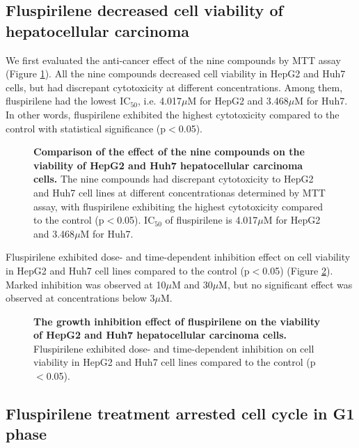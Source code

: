 \documentclass[10pt,letterpaper]{article}
\begin{document}
\subsection*{Fluspirilene decreased cell viability of hepatocellular carcinoma}

We first evaluated the anti-cancer effect of the nine compounds by MTT assay (Figure \ref{CellViabilityAgainstConcentration}). All the nine compounds decreased cell viability in HepG2 and Huh7 cells, but had discrepant cytotoxicity at different concentrations. Among them, fluspirilene had the lowest IC$_{50}$, i.e. 4.017$\mu$M for HepG2 and 3.468$\mu$M for Huh7. In other words, fluspirilene exhibited the highest cytotoxicity compared to the control with statistical significance (p$<$0.05).

\begin{figure}
\caption{{\bf Comparison of the effect of the nine compounds on the viability of HepG2 and Huh7 hepatocellular carcinoma cells.} The nine compounds had discrepant cytotoxicity to HepG2 and Huh7 cell lines at different concentrationas determined by MTT assay, with fluspirilene exhibiting the highest cytotoxicity compared to the control (p$<$0.05). IC$_{50}$ of fluspirilene is 4.017$\mu$M for HepG2 and 3.468$\mu$M for Huh7.}
\label{CellViabilityAgainstConcentration}
\end{figure}

Fluspirilene exhibited dose- and time-dependent inhibition effect on cell viability in HepG2 and Huh7 cell lines compared to the control (p$<$0.05) (Figure \ref{CellViabilityAgainstTime}). Marked inhibition was observed at 10$\mu$M and 30$\mu$M, but no significant effect was observed at concentrations below 3$\mu$M.

\begin{figure}
\caption{{\bf The growth inhibition effect of fluspirilene on the viability of HepG2 and Huh7 hepatocellular carcinoma cells.} Fluspirilene exhibited dose- and time-dependent inhibition on cell viability in HepG2 and Huh7 cell lines compared to the control (p$<$0.05).}
\label{CellViabilityAgainstTime}
\end{figure}

\subsection*{Fluspirilene treatment arrested cell cycle in G1 phase}
\end{document}
